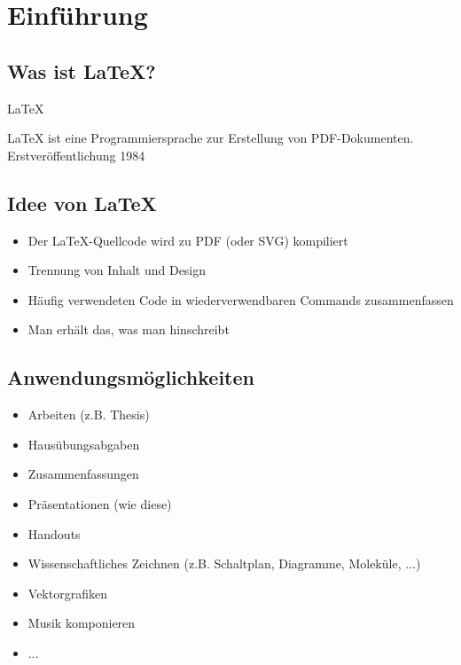 \documentclass[
    ngerman,
    accentcolor=3b,
    dark_mode,
    fontsize= 12pt,
    a4paper,
    aspectratio=169,
    colorback=true,
    fancy_row_colors,
    leqno,
    fleqn,
    boxarc=3pt,
    fleqn,
    design=2008,
]{algoslides}
\begin{document}
    \section{Einführung}\label{1}\label{Einfuehrung}
    \subsection{Was ist \LaTeX?}\label{1.1}\label{1.1}
    \begin{frame}[c]
        \slidehead{}
        \centering\fontsize{40pt}{45pt}\selectfont\LaTeX

        \medskip\normalsize{}

        \vfill
        LaTeX ist eine Programmiersprache zur Erstellung von PDF-Dokumenten. Erstveröffentlichung 1984
    \end{frame}
    \subsection{Idee von \LaTeX}\label{1.2}\label{1.2}
    \begin{frame}
        \slidehead{}
        \begin{itemize}
            \item Der \LaTeX-Quellcode wird zu PDF (oder SVG) kompiliert
            \item Trennung von Inhalt und Design
            \item Häufig verwendeten Code in wiederverwendbaren Commands zusammenfassen
            \item Man erhält  das, was man hinschreibt
        \end{itemize}
    \end{frame}
    \subsection{Anwendungsmöglichkeiten}
    \begin{frame}
        \slidehead{}
        \begin{itemize}
            \item Arbeiten (z.B. Thesis)
            \item Hausübungsabgaben
            \item Zusammenfassungen
            \item Präsentationen (wie diese)
            \item Handouts
            \item Wissenschaftliches Zeichnen (z.B. Schaltplan, Diagramme, Moleküle, $\dots$)
            \item Vektorgrafiken
            \item Musik komponieren
            \item $\dots$
        \end{itemize}
    \end{frame}
\end{document}
